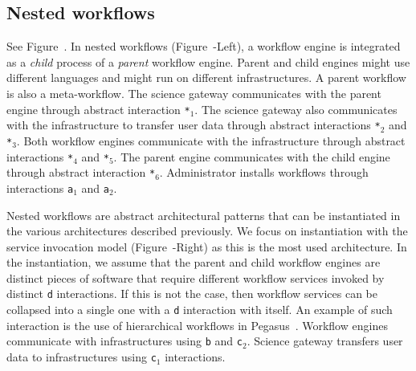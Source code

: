 \documentclass[preprint,3p,twocolumn]{elsarticle}
\begin{document}
\subsection{Nested workflows}

See Figure~. In nested workflows
(Figure~-Left), a workflow engine is integrated
as a \emph{child} process of a \emph{parent} workflow engine. Parent
and child engines might use different languages and might run on
different infrastructures. A parent workflow is also a
meta-workflow. The science gateway communicates with the parent engine
through abstract interaction \texttt{*$_1$}. The science gateway also
communicates with the infrastructure to transfer user data through
abstract interactions \texttt{*$_2$} and \texttt{*$_3$}. Both workflow
engines communicate with the infrastructure through abstract
interactions \texttt{*$_4$} and \texttt{*$_5$}. The parent engine
communicates with the child engine through abstract interaction
\texttt{*$_6$}. Administrator installs workflows through interactions
\texttt{a$_1$} and \texttt{a$_2$}.

Nested workflows are abstract architectural patterns that can be
instantiated in the various architectures described previously. We
focus on instantiation with the service invocation model
(Figure~-Right) as this is the most used
architecture. In the instantiation, we assume that the parent and
child workflow engines are distinct pieces of software that require
different workflow services invoked by distinct \texttt{d}
interactions. If this is not the case, then workflow services can be
collapsed into a single one with a \texttt{d} interaction with
itself. An example of such interaction is the use of hierarchical
workflows in Pegasus~\cite{Deelman201517}.
Workflow engines communicate with infrastructures using
\texttt{b} and \texttt{c$_2$}. Science gateway transfers user data to
infrastructures using \texttt{c$_1$} interactions.
\end{document}
